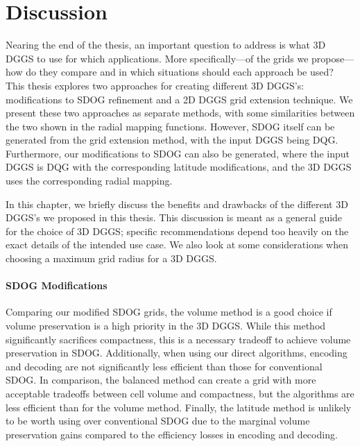 \chapter{Discussion} \label{chap:discussion}
Nearing the end of the thesis, an important question to address is what 3D DGGS to use for which applications.
More specifically---of the grids we propose---how do they compare and in which situations should each approach be used?
This thesis explores two approaches for creating different 3D DGGS's: modifications to SDOG refinement and a 2D DGGS grid extension technique.
We present these two approaches as separate methods, with some similarities between the two shown in the radial mapping functions.
However, SDOG itself can be generated from the grid extension method, with the input DGGS being DQG.
Furthermore, our modifications to SDOG can also be generated, where the input DGGS is DQG with the corresponding latitude modifications, and the 3D DGGS uses the corresponding radial mapping.


In this chapter, we briefly discuss the benefits and drawbacks of the different 3D DGGS's we proposed in this thesis.
This discussion is meant as a general guide for the choice of 3D DGGS; specific recommendations depend too heavily on the exact details of the intended use case.
We also look at some considerations when choosing a maximum grid radius for a 3D DGGS.


\subsubsection{SDOG Modifications}
Comparing our modified SDOG grids, the volume method is a good choice if volume preservation is a high priority in the 3D DGGS.
While this method significantly sacrifices compactness, this is a necessary tradeoff to achieve volume preservation in SDOG. Additionally, when using our direct algorithms, encoding and decoding are not significantly less efficient than those for conventional SDOG.
In comparison, the balanced method can create a grid with more acceptable tradeoffs between cell volume and compactness, but the algorithms are less efficient than for the volume method.
Finally, the latitude method is unlikely to be worth using over conventional SDOG due to the marginal volume preservation gains compared to the efficiency losses in encoding and decoding.


